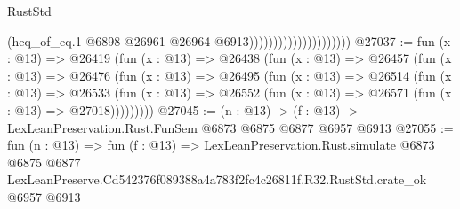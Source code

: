 \begin{lexlean}{RustStd}
\begin{coremodule}
                                            (heq_of_eq.{1}
                                              @6898
                                              @26961
                                              @26964
                                              @6913)))))))))))))))))))))
@27037 := fun (x : @13) =>
  @26419
    (fun (x : @13) =>
    @26438
      (fun (x : @13) =>
      @26457
        (fun (x : @13) =>
        @26476
          (fun (x : @13) =>
          @26495
            (fun (x : @13) =>
            @26514
              (fun (x : @13) =>
              @26533
                (fun (x : @13) => @26552 (fun (x : @13) => @26571 (fun (x : @13) => @27018)))))))))
@27045 := (n : @13) -> (f : @13) -> LexLeanPreservation.Rust.FunSem @6873 @6875 @6877 @6957 @6913
@27055 := fun (n : @13) =>
  fun (f : @13) =>
  LexLeanPreservation.Rust.simulate
    @6873
    @6875
    @6877
    LexLeanPreserve.Cd542376f089388a4a783f2fc4c26811f.R32.RustStd.crate_ok
    @6957
    @6913
\end{coremodule}
\end{lexlean}
